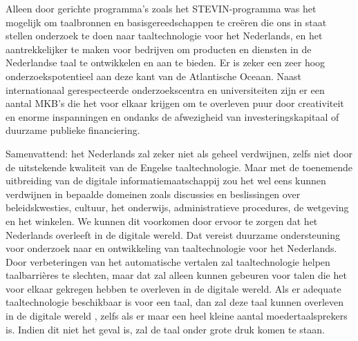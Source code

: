 \begin{multicols}{2}
Alleen door gerichte programma's zoals het STEVIN-programma was het mogelijk om taalbronnen en basisgereedschappen te cre{\"e}ren die ons  in staat stellen onderzoek te doen naar taaltechnologie voor het Nederlands, en het aantrekkelijker te maken voor bedrijven om producten en diensten in de Nederlandse taal te ontwikkelen en aan te bieden. Er is zeker een zeer hoog onderzoekspotentieel aan deze kant van de Atlantische Oceaan. Naast internationaal gerespecteerde onderzoekscentra en universiteiten zijn er een aantal MKB's die het voor elkaar krijgen om te overleven puur door creativiteit en enorme inspanningen en ondanks de afwezigheid van investeringskapitaal of duurzame publieke financiering.

Samenvattend: het Nederlands zal zeker niet als geheel verdwijnen, zelfs niet door de uitstekende kwaliteit van de Engelse taaltechnologie. Maar met de toenemende uitbreiding van de digitale informatiemaatschappij  zou het wel eens kunnen verdwijnen in bepaalde domeinen zoals discussies en beslissingen over beleidskwesties, cultuur, het onderwijs, administratieve procedures, de wetgeving en het winkelen. We kunnen dit voorkomen door ervoor te zorgen dat het Nederlands overleeft in de digitale wereld. Dat vereist duurzame ondersteuning voor onderzoek naar en ontwikkeling van taaltechnologie voor het Nederlands.
Door verbeteringen van het automatische vertalen zal taaltechnologie helpen taalbarri{\`e}res te slechten, maar dat zal alleen kunnen gebeuren voor talen die het voor elkaar gekregen hebben te overleven in de digitale wereld.
Als er adequate taaltechnologie beschikbaar is voor een taal, dan zal deze taal kunnen overleven  in de digitale wereld , zelfs als er maar een heel kleine aantal moedertaalsprekers is. Indien dit niet het geval is, zal de taal onder grote druk komen te staan.


\end{multicols}

\clearpage



